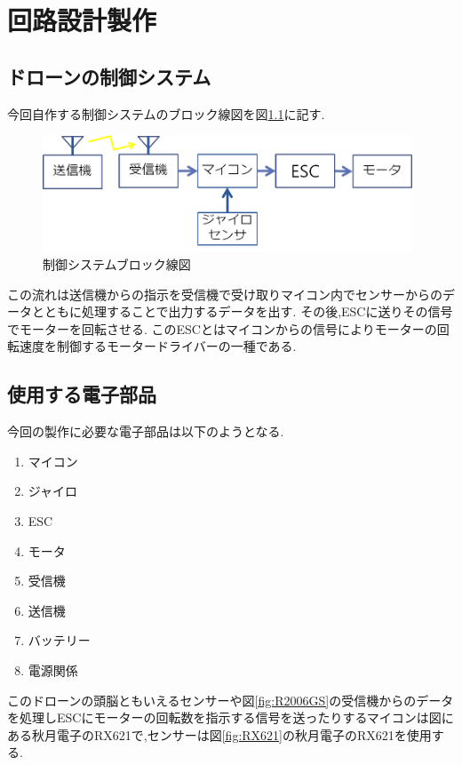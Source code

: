 \documentclass[12pt,oneside]{paper}
\begin{document}
\chapter{回路設計製作}
\section{ドローンの制御システム}今回自作する制御システムのブロック線図を図\ref{fig:brok}に記す.

\begin{figure}[H]
  \begin{center}
    \includegraphics[width=110mm]{ga/brok.png}
    \end{center}
  \caption{制御システムブロック線図}
 \label{fig:brok}
\end{figure}

この流れは送信機からの指示を受信機で受け取りマイコン内でセンサーからのデータとともに処理することで出力するデータを出す.
その後,ESCに送りその信号でモーターを回転させる.
このESCとはマイコンからの信号によりモーターの回転速度を制御するモータードライバーの一種である.


\section{使用する電子部品}
今回の製作に必要な電子部品は以下のようとなる.

\begin{enumerate}
\item マイコン
\item ジャイロ
\item ESC
\item モータ
\item 受信機
\item 送信機
\item バッテリー
\item 電源関係
\end{enumerate}

このドローンの頭脳ともいえるセンサーや図\ref{fig:R2006GS}の受信機からのデータを処理しESCにモーターの回転数を指示する信号を送ったりするマイコンは図にある秋月電子のRX621で,センサーは図\ref{fig:RX621}の秋月電子のRX621を使用する.
\end{document}
